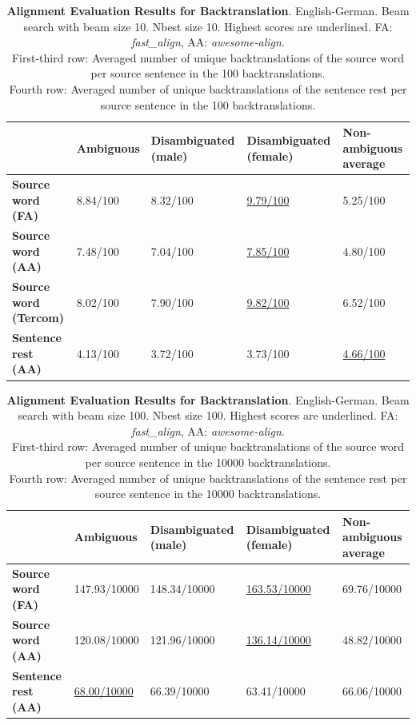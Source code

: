 \begin{table} 
    \begin{tabularx}{\linewidth}{|X|XXXX|}
        \hline
         & \textbf{Ambiguous} & \textbf{Disambiguated (male)} & \textbf{Disambiguated (female)} & \textbf{Non-ambiguous average} \\ \hline
         \textbf{Source word (FA)} & 8.84/100 & 8.32/100 & \underline{9.79/100} & 5.25/100 \\ 
         \textbf{Source word (AA)} & 7.48/100 & 7.04/100 & \underline{7.85/100} & 4.80/100 \\ 
         \textbf{Source word (Tercom)} & 8.02/100 & 7.90/100 & \underline{9.82/100} & 6.52/100 \\ \hline
         \textbf{Sentence rest (AA)} & 4.13/100 & 3.72/100 & 3.73/100 & \underline{4.66/100} \\ \hline
    \end{tabularx}
    \caption{\textbf{Alignment Evaluation Results for Backtranslation}. English-German. Beam search with beam size 10. Nbest size 10. Highest scores are underlined. FA: \textit{fast\_align}, AA: \textit{awesome-align}. \\ First-third row: Averaged number of unique backtranslations of the source word per source sentence in the 100 backtranslations. \\ Fourth row: Averaged number of unique backtranslations of the sentence rest per source sentence in the 100 backtranslations.}
    \label{tab:alignment_backtranslation_10}
\end{table}

\begin{table} 
    \begin{tabularx}{\linewidth}{|X|XXXX|}
        \hline
         & \textbf{Ambiguous} & \textbf{Disambiguated (male)} & \textbf{Disambiguated (female)} & \textbf{Non-ambiguous average} \\ \hline
         \textbf{Source word (FA)} & 147.93/10000 & 148.34/10000 & \underline{163.53/10000} & 69.76/10000 \\ 
         \textbf{Source word (AA)} & 120.08/10000 & 121.96/10000 & \underline{136.14/10000} & 48.82/10000 \\ \hline 
         \textbf{Sentence rest (AA)} & \underline{68.00/10000} & 66.39/10000 & 63.41/10000 & 66.06/10000 \\ \hline
    \end{tabularx}
    \caption{\textbf{Alignment Evaluation Results for Backtranslation}. English-German. Beam search with beam size 100. Nbest size 100. Highest scores are underlined. FA: \textit{fast\_align}, AA: \textit{awesome-align}. \\ First-third row: Averaged number of unique backtranslations of the source word per source sentence in the 10000 backtranslations. \\ Fourth row: Averaged number of unique backtranslations of the sentence rest per source sentence in the 10000 backtranslations.}
    \label{tab:alignment_backtranslation_100}
\end{table}




